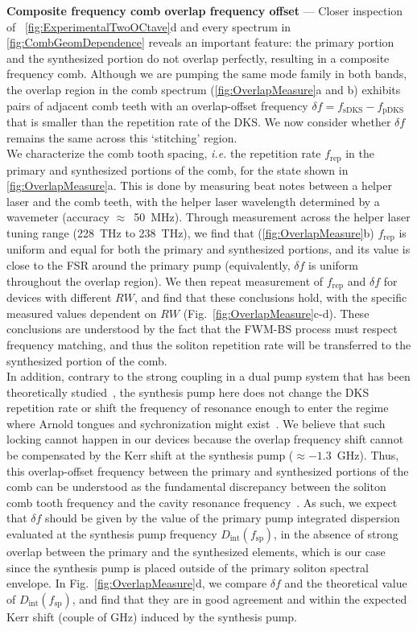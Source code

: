 \documentclass[reprint,superscriptaddress, amsmath,amssymb,pra, aps,floatfix,longbibliography]{revtex4-1}
\begin{document}
\noindent \textbf{Composite frequency comb overlap frequency offset} — Closer inspection of ~\cref{fig:ExperimentalTwoOCtave}d and every spectrum in \cref{fig:CombGeomDependence} reveals an important feature: the primary portion and the synthesized portion do not overlap perfectly, resulting in a composite frequency comb. Although we are pumping the same mode family in both bands, the overlap region in the comb spectrum (\cref{fig:OverlapMeasure}a and b) exhibits pairs of adjacent comb teeth with an overlap-offset frequency $\delta f = f_\mathrm{sDKS} - f_\mathrm{pDKS}$ that is smaller than the repetition rate of the DKS. We now consider whether $\delta f$ remains the same across this `stitching’ region.\\
%
{\indent}We characterize the comb tooth spacing, \textit{i.e.} the repetition rate $f_\mathrm{rep}$ in the primary and synthesized portions of the comb, for the state shown in \cref{fig:OverlapMeasure}a. This is done by measuring beat notes between a helper laser and the comb teeth, with the helper laser wavelength determined by a wavemeter (accuracy $\approx$~50~MHz). Through measurement across the helper laser tuning range (228~THz to 238~THz), we find that (\cref{fig:OverlapMeasure}b) $f_\mathrm{rep}$ is uniform and equal for both the primary and synthesized portions, and its value is close to the FSR around the primary pump (equivalently, $\delta f$ is uniform throughout the overlap region). We then repeat measurement of $f_\mathrm{rep}$ and $\delta f$ for devices with different $RW$, and find that these conclusions hold, with the specific measured values dependent on $RW$ (Fig.~\ref{fig:OverlapMeasure}c-d). These conclusions are understood by the fact that the FWM-BS process must respect frequency matching, and thus the soliton repetition rate will be transferred to the synthesized portion of the comb.\\
%
{\indent}In addition, contrary to the strong coupling in a dual pump system that has been theoretically studied~\cite{taheri_optical_2017, hanson_bichropumping}, the synthesis pump here does not change the DKS repetition rate or shift the frequency of resonance enough to enter the regime where Arnold tongues and sychronization might exist~\cite{skryabin_arnoldtongues}. We believe that such locking cannot happen in our devices because the overlap frequency shift cannot be compensated by the Kerr shift at the synthesis pump ($\approx -1.3$~GHz). Thus, this overlap-offset frequency between the primary and synthesized portions of the comb can be understood as the fundamental discrepancy between the soliton comb tooth frequency and the cavity resonance frequency~\cite{guo_universal_2017}. As such, we expect that $\delta f$ should be given by the value of the primary pump integrated dispersion evaluated at the synthesis pump frequency $D_\mathrm{int}(f_\mathrm{sp})$, in the absence of strong overlap between the primary and the synthesized elements, which is our case since the synthesis pump is placed outside of the primary soliton spectral envelope. In Fig.~\ref{fig:OverlapMeasure}d, we compare $\delta f$ and the theoretical value of $D_\mathrm{int}(f_\mathrm{sp})$, and find that they are in good agreement and within the expected Kerr shift (couple of GHz) induced by the synthesis pump.
\end{document}
